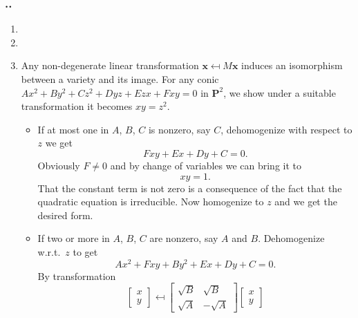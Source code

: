 \documentclass{note}
\newcounter{exercise}[section]
\newcommand{\Ex}{%
    \stepcounter{exercise}%
    \subsubsection*{\thesection.\arabic{exercise}.}%
}
\newcommand{\Proj}[1]{\mathbf{P}^{#1}}
\begin{document}


\Ex
\begin{enumerate}
  \item
  \item
  \item Any non-degenerate linear transformation $\mathbf{x} \mapsfrom M\mathbf{x}$
        induces an isomorphism between a variety and its image. For any conic $Ax^2
        + By^2 + Cz^2 + Dyz + Ezx + Fxy = 0$ in $\Proj{2}$, we show under a suitable
        transformation it becomes $xy = z^2$.
        \begin{itemize}
          \item If at most one in $A$, $B$, $C$ is nonzero, say $C$, dehomogenize
                with respect to $z$ we get
                \begin{equation*}
                  Fxy + Ex + Dy + C = 0.
                \end{equation*}
                Obviously $F \ne 0$ and by change of variables we can bring it to
                \begin{equation*}
                  xy = 1.
                \end{equation*}
                That the constant term is not zero is a consequence of the fact that
                the quadratic equation is irreducible. Now homogenize to $z$ and we
                get the desired form.
          \item If two or more in $A$, $B$, $C$ are nonzero, say $A$ and $B$.
                Dehomogenize w.r.t.~$z$ to get
                \begin{equation*}
                  Ax^2 + Fxy + By^2 + Ex + Dy + C = 0.
                \end{equation*}
                By transformation
                \begin{equation*}
                  \begin{bmatrix}
                    x \\ y
                  \end{bmatrix}
                  \mapsfrom
                  \begin{bmatrix}
                    \sqrt{B} & \sqrt{B}  \\
                    \sqrt{A} & -\sqrt{A}
                  \end{bmatrix}
                  \begin{bmatrix}
                    x \\ y

\end{bmatrix}
\end{equation*}
\end{itemize}
\end{enumerate}
\end{document}
